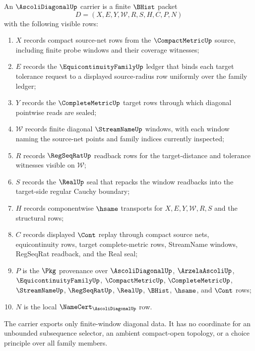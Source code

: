 \begin{definition}
\label{def:ascoli-diagonal-carrier}
An $\AscoliDiagonalUp$ carrier is a finite $\BHist$ packet
$$
D=(X,E,Y,\mathcal{W},R,S,H,C,P,N)
$$
with the following visible rows:
\begin{enumerate}
\item $X$ records compact source-net rows from the $\CompactMetricUp$ source,
including finite probe windows and their coverage witnesses;
\item $E$ records the $\EquicontinuityFamilyUp$ ledger that binds each target
tolerance request to a displayed source-radius row uniformly over the family
ledger;
\item $Y$ records the $\CompleteMetricUp$ target rows through which diagonal
pointwise reads are sealed;
\item $\mathcal{W}$ records finite diagonal $\StreamNameUp$ windows, with each
window naming the source-net points and family indices currently inspected;
\item $R$ records $\RegSeqRatUp$ readback rows for the target-distance and
tolerance witnesses visible on $\mathcal{W}$;
\item $S$ records the $\RealUp$ seal that repacks the window readbacks into the
target-side regular Cauchy boundary;
\item $H$ records componentwise $\hsame$ transports for $X,E,Y,\mathcal{W},R,S$
and the structural rows;
\item $C$ records displayed $\Cont$ replay through compact source nets,
equicontinuity rows, target complete-metric rows, StreamName windows,
RegSeqRat readback, and the Real seal;
\item $P$ is the $\Pkg$ provenance over $\AscoliDiagonalUp$,
$\ArzelaAscoliUp$, $\EquicontinuityFamilyUp$, $\CompactMetricUp$,
$\CompleteMetricUp$, $\StreamNameUp$, $\RegSeqRatUp$, $\RealUp$, $\BHist$,
$\hsame$, and $\Cont$ rows;
\item $N$ is the local $\NameCert_{\AscoliDiagonalUp}$ row.
\end{enumerate}
The carrier exports only finite-window diagonal data. It has no coordinate for
an unbounded subsequence selector, an ambient compact-open topology, or a
choice principle over all family members.
\end{definition}

